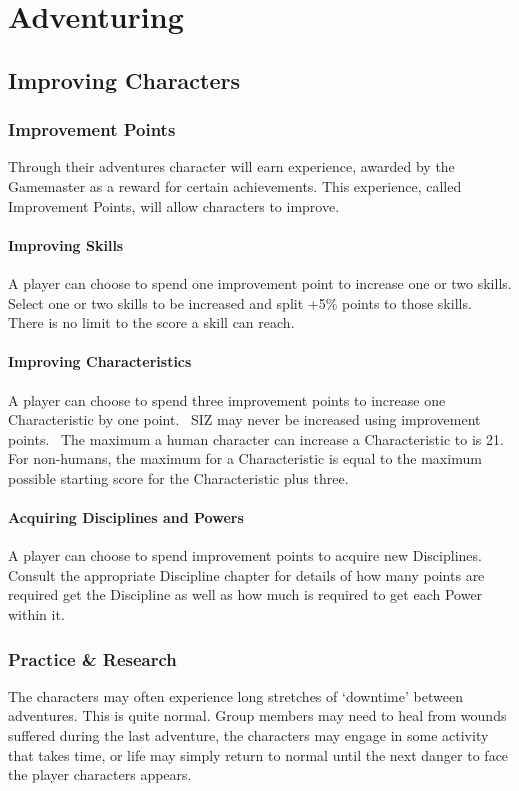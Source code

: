 \chapter{Adventuring}
\label{ch:adventuring}

\section{Improving Characters}

\subsection{Improvement Points}
\label{ssec:improvement-points}
Through their adventures character will earn experience, awarded by the Gamemaster as a reward for certain achievements. This experience, called Improvement Points, will allow characters to improve.

\subsubsection{Improving Skills}
A player can choose to spend one improvement point to increase one or two skills.
Select one or two skills to be increased and split +5\% points to those skills.
There is no limit to the score a skill can reach. 

\subsubsection{Improving Characteristics}
A player can choose to spend three improvement points to increase one Characteristic by one point. 
SIZ may never be increased using improvement points. 
The maximum a human character can increase a Characteristic to is 21. For non-humans, the maximum for a Characteristic is equal to the maximum possible starting score for the Characteristic plus three.

\subsubsection{Acquiring Disciplines and Powers}
A player can choose to spend improvement points to acquire new Disciplines. Consult the appropriate Discipline chapter for details of how many points are required get the Discipline as well as how much is required to get each Power within it.

\subsection{Practice \& Research}
The characters may often experience long stretches of ‘downtime’ between adventures. This is quite normal. Group members may need to heal from wounds suffered during the last adventure, the characters may engage in some activity that takes time, or life may simply return to normal until the next danger to face the player characters appears.

